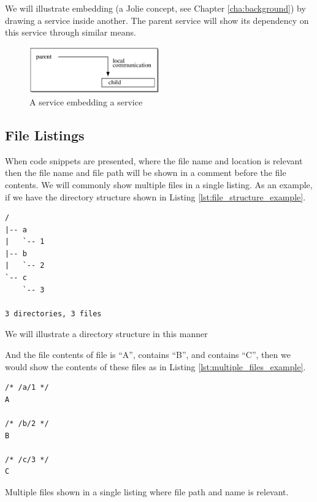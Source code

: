 We will illustrate embedding (a Jolie concept, see Chapter \ref{cha:background})
by drawing a service inside another. The parent service will show its
dependency on this service through similar means.

\begin{figure}[H]

\centering
\includegraphics[width=0.5\textwidth]{introduction/embedding.eps}

\caption{A  service embedding a  service}

\label{fig:box_and_line_embedding}

\end{figure}

\subsection*{File Listings}

When code snippets are presented, where the file name and location is relevant
then the file name and file path will be shown in a comment before the file
contents. We will commonly show multiple files in a single listing.  As an
example, if we have the directory structure shown in Listing
\ref{lst:file_structure_example}.

\begin{listing}[H]
\begin{verbatim}
/
|-- a
|   `-- 1
|-- b
|   `-- 2
`-- c
    `-- 3

3 directories, 3 files
\end{verbatim}
\caption{We will illustrate a directory structure in this manner}
\label{lst:file_structure_example}
\end{listing}

And the file contents of file  is ``A'',  contains ``B'',
    and  contains ``C'', then we would show the contents of these
    files as in Listing \ref{lst:multiple_files_example}.

\begin{listing}[H]
\begin{verbatim}
/* /a/1 */
A

/* /b/2 */
B

/* /c/3 */
C
\end{verbatim}

\caption{Multiple files shown in a single listing where file path and name is
    relevant.}

\label{lst:multiple_files_example}
\end{listing}

